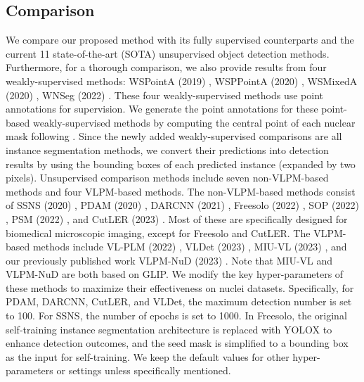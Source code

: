 \documentclass[journal,twoside,web]{ieeecolor}
\begin{document}
\subsection{Comparison}

We compare our proposed method with its fully supervised counterparts and the current 11 state-of-the-art (SOTA) unsupervised object detection methods. Furthermore, for a thorough comparison, we also provide results from four weakly-supervised methods: WSPointA (2019) \cite{qu2019weakly}, WSPPointA (2020) \cite{qu2020weakly}, WSMixedA (2020) \cite{qu2020nuclei}, WNSeg (2022) \cite{liu2022weakly}. These four weakly-supervised methods use point annotations for supervision. We generate the point annotations for these point-based weakly-supervised methods by computing the central point of each nuclear mask following \cite{qu2019weakly}. Since the newly added weakly-supervised comparisons are all instance segmentation methods, we convert their predictions into detection results by using the bounding boxes of each predicted instance (expanded by two pixels). Unsupervised comparison methods include seven non-VLPM-based methods and four VLPM-based methods. The non-VLPM-based methods consist of SSNS (2020) \cite{sahasrabudhe2020self}, PDAM (2020) \cite{liu2020pdam}, DARCNN (2021) \cite{hsu2021darcnn}, Freesolo (2022) \cite{wang2022freesolo}, SOP (2022) \cite{le2022unsupervised}, PSM (2022) \cite{chen2022unsupervised}, and CutLER (2023) \cite{wang2023cut}. Most of these are specifically designed for biomedical microscopic imaging, except for Freesolo and CutLER. The VLPM-based methods include VL-PLM (2022) \cite{zhao2022exploiting}, VLDet (2023) \cite{lin2022learning}, MIU-VL (2023) \cite{qin2022medical}, and our previously published work VLPM-NuD (2023) \cite{wu2023zeroshot}. Note that MIU-VL and VLPM-NuD are both based on GLIP. We modify the key hyper-parameters of these methods to maximize their effectiveness on nuclei datasets. Specifically, for PDAM, DARCNN, CutLER, and VLDet, the maximum detection number is set to 100. For SSNS, the number of epochs is set to 1000. In Freesolo, the original self-training instance segmentation architecture is replaced with YOLOX to enhance detection outcomes, and the seed mask is simplified to a bounding box as the input for self-training. We keep the default values for other hyper-parameters or settings unless specifically mentioned.
\end{document}
